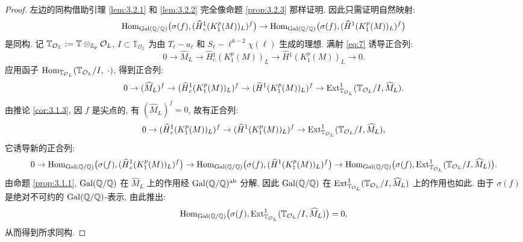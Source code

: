 \begin{proof}
左边的同构借助引理 \ref{lem:3.2.1} 和 \ref{lem:3.2.2} 完全像命题 \ref{prop:3.2.3} 那样证明.
因此只需证明自然映射:
\begin{equation}
\label{eq:16}
\operatorname{Hom}_{\operatorname{Gal}(\mathbb{Q}/\mathbb{Q})}\bigl(\sigma(f),(\widehat{H}{}_{c}^{1}(K_1^{p}(M))_L)^{f}\bigr) \to \operatorname{Hom}_{\operatorname{Gal}(\mathbb{Q}/\mathbb{Q})}\bigl(\sigma(f),(\widehat{H}{}^{1}(K_1^{p}(M))_L)^{f}\bigr)
\end{equation}
是同构.
记 $\mathbb{T}_{\mathcal{O}_L} := \mathbb{T} \otimes_{\mathbb{Z}_p} \mathcal{O}_L$, $I \subset \mathbb{T}_{\mathcal{O}_L}$ 为由 $T_{\ell} - a_{\ell}$ 和 $S_{\ell} - \ell^{k-2}\chi(\ell)$ 生成的理想.
满射 \eqref{eq:7} 诱导正合列:
\[
0 \to \widehat{M}_L \to \widehat{H}{}_{c}^{1}(K_1^{p}(M))_L \to \widehat{H}{}^{1}(K_1^{p}(M))_L \to 0.
\]
应用函子 $\Hom_{\mathbb{T}_{\mathcal{O}_L}}(\mathbb{T}_{\mathcal{O}_L}/I,\ \cdot)$, 得到正合列:
\[
0 \to (\widehat{M}_L)^{f} \to (\widehat{H}{}_{c}^{1}(K_1^{p}(M))_L)^{f} \to (\widehat{H}{}^{1}(K_1^{p}(M))_L)^{f} \to \operatorname{Ext}_{\mathbb{T}_{\mathcal{O}_L}}^{1}(\mathbb{T}_{\mathcal{O}_L}/I,\widehat{M}_L).
\]
由推论 \ref{cor:3.1.3}, 因 $f$ 是尖点的, 有 $(\widehat{M}_L)^{f} = 0$, 故有正合列:
\[
0 \to (\widehat{H}{}_{c}^{1}(K_1^{p}(M))_L)^{f} \to (\widehat{H}{}^{1}(K_1^{p}(M))_L)^{f} \to \operatorname{Ext}_{\mathbb{T}_{\mathcal{O}_L}}^{1}(\mathbb{T}_{\mathcal{O}_L}/I,\widehat{M}_L),
\]
它诱导新的正合列:
\[
0 \to \operatorname{Hom}_{\operatorname{Gal}(\mathbb{Q}/\mathbb{Q})}\bigl(\sigma(f),(\widehat{H}{}_{c}^{1}(K_1^{p}(M))_L)^{f}\bigr)
\to \operatorname{Hom}_{\operatorname{Gal}(\mathbb{Q}/\mathbb{Q})}\bigl(\sigma(f),(\widehat{H}{}^{1}(K_1^{p}(M))_L)^{f}\bigr)
\to \operatorname{Hom}_{\operatorname{Gal}(\mathbb{Q}/\mathbb{Q})}\bigl(\sigma(f),\operatorname{Ext}_{\mathbb{T}_{\mathcal{O}_L}}^{1}(\mathbb{T}_{\mathcal{O}_L}/I,\widehat{M}_L)\bigr).
\]
由命题 \ref{prop:3.1.1}, $\operatorname{Gal}(\mathbb{Q}/\mathbb{Q})$ 在 $\widehat{M}_L$ 上的作用经 $\operatorname{Gal}(\mathbb{Q}/\mathbb{Q})^{\mathrm{ab}}$ 分解, 因此 $\operatorname{Gal}(\mathbb{Q}/\mathbb{Q})$ 在 $\operatorname{Ext}_{\mathbb{T}_{\mathcal{O}_L}}^{1}(\mathbb{T}_{\mathcal{O}_L}/I,\widehat{M}_L)$ 上的作用也如此.
由于 $\sigma(f)$ 是绝对不可约的 $\operatorname{Gal}(\mathbb{Q}/\mathbb{Q})$-表示, 由此推出:
\[
\operatorname{Hom}_{\operatorname{Gal}(\mathbb{Q}/\mathbb{Q})}\bigl(\sigma(f),\operatorname{Ext}_{\mathbb{T}_{\mathcal{O}_L}}^{1}(\mathbb{T}_{\mathcal{O}_L}/I,\widehat{M}_L)\bigr) = 0,
\]
从而得到所求同构.
\end{proof}
